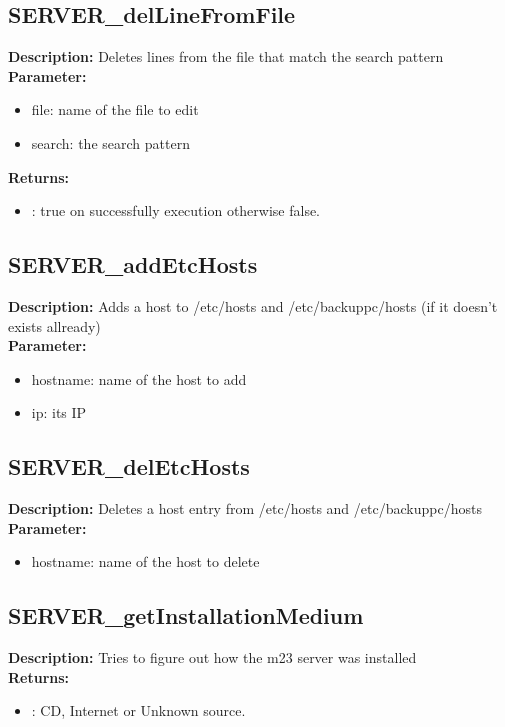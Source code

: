 \subsection{SERVER\_delLineFromFile}
\textbf{Description:} Deletes lines from the file that match the search pattern\\
\textbf{Parameter:}
\begin{itemize}
\item file: name of the file to edit
\item search: the search pattern
\end{itemize}
\textbf{Returns:}
\begin{itemize}
\item : true on successfully execution otherwise false.
\end{itemize}

\subsection{SERVER\_addEtcHosts}
\textbf{Description:} Adds a host to /etc/hosts and /etc/backuppc/hosts (if it doesn't exists allready)\\
\textbf{Parameter:}
\begin{itemize}
\item hostname: name of the host to add
\item ip: its IP
\end{itemize}

\subsection{SERVER\_delEtcHosts}
\textbf{Description:} Deletes a host entry from /etc/hosts and /etc/backuppc/hosts\\
\textbf{Parameter:}
\begin{itemize}
\item hostname: name of the host to delete
\end{itemize}

\subsection{SERVER\_getInstallationMedium}
\textbf{Description:} Tries to figure out how the m23 server was installed\\
\textbf{Returns:}
\begin{itemize}
\item : CD, Internet or Unknown source.
\end{itemize}

